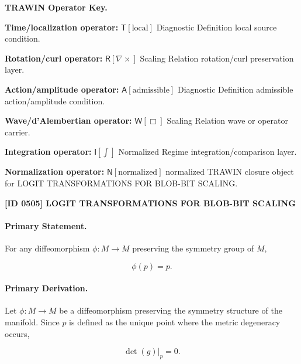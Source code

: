 \par\vspace{0.45\baselineskip}
\noindent\begin{minipage}[t]{\linewidth}
\begingroup
\small
\raggedright
\textbf{TRAWIN Operator Key.}\par
\noindent\textbf{Time/localization operator:} $\mathsf{T}\!\left[\mathrm{local}\right]$ Diagnostic Definition local source condition.\par
\noindent\textbf{Rotation/curl operator:} $\mathsf{R}\!\left[\nabla\times\right]$ Scaling Relation rotation/curl preservation layer.\par
\noindent\textbf{Action/amplitude operator:} $\mathsf{A}\!\left[\mathrm{admissible}\right]$ Diagnostic Definition admissible action/amplitude condition.\par
\noindent\textbf{Wave/d'Alembertian operator:} $\mathsf{W}\!\left[\Box\right]$ Scaling Relation wave or operator carrier.\par
\noindent\textbf{Integration operator:} $\mathsf{I}\!\left[\int\right]$ Normalized Regime integration/comparison layer.\par
\noindent\textbf{Normalization operator:} $\mathsf{N}\!\left[\mathrm{normalized}\right]$ normalized TRAWIN closure object for LOGIT TRANSFORMATIONS FOR BLOB-BIT SCALING.\par
\endgroup
\end{minipage}

\clearpage
\noindent\textbf{[ID 0505] LOGIT TRANSFORMATIONS FOR BLOB-BIT SCALING}\par
\vspace{0.35em}
\paragraph{Primary Statement.}
For any diffeomorphism $\phi:M\to M$ preserving the symmetry group of $M$,

\begin{equation}
\phi(p)=p .
\end{equation}

\paragraph{Primary Derivation.}
Let $\phi:M\to M$ be a diffeomorphism preserving the symmetry structure of the manifold. Since $p$ is defined as the unique point where the metric degeneracy occurs,

\begin{equation}
\det(g)\big|_p=0 .
\end{equation}

